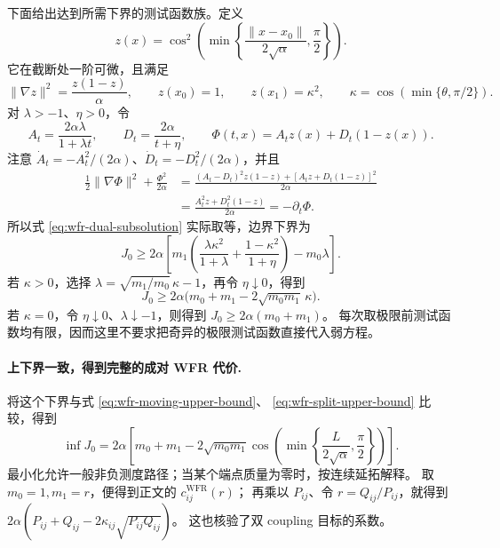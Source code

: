 \documentclass[UTF8,a4paper,11pt,fontset=fandol]{ctexart}
\begin{document}
下面给出达到所需下界的测试函数族。定义
\begin{equation}
z(x)=\cos^2\!\left(
\min\left\{\frac{\|x-x_0\|}{2\sqrt\alpha},\frac\pi2\right\}\right).
\end{equation}
它在截断处一阶可微，且满足
\begin{equation}
\|\nabla z\|^2=\frac{z(1-z)}\alpha,\qquad
z(x_0)=1,\qquad z(x_1)=\kappa^2,\qquad
\kappa=\cos(\min\{\theta,\pi/2\}).
\end{equation}
对 $\lambda>-1$、$\eta>0$，令
\begin{equation}
A_t=\frac{2\alpha\lambda}{1+\lambda t},\qquad
D_t=\frac{2\alpha}{t+\eta},\qquad
\Phi(t,x)=A_tz(x)+D_t(1-z(x)).
\end{equation}
注意 $\dot A_t=-A_t^2/(2\alpha)$、$\dot D_t=-D_t^2/(2\alpha)$，并且
\begin{equation}
\begin{aligned}
\frac12\|\nabla\Phi\|^2+\frac{\Phi^2}{2\alpha}
&=\frac{(A_t-D_t)^2z(1-z)+[A_tz+D_t(1-z)]^2}{2\alpha}\\
&=\frac{A_t^2z+D_t^2(1-z)}{2\alpha}
=-\partial_t\Phi.
\end{aligned}
\end{equation}
所以式 \eqref{eq:wfr-dual-subsolution} 实际取等，边界下界为
\begin{equation}
J_0\ge2\alpha\left[
m_1\left(\frac{\lambda\kappa^2}{1+\lambda}
+\frac{1-\kappa^2}{1+\eta}\right)-m_0\lambda\right].
\end{equation}
若 $\kappa>0$，选择 $\lambda=\sqrt{m_1/m_0}\,\kappa-1$，再令 $\eta\downarrow0$，得到
\begin{equation}
J_0\ge2\alpha\bigl(m_0+m_1-2\sqrt{m_0m_1}\,\kappa\bigr).
\end{equation}
若 $\kappa=0$，令 $\eta\downarrow0$、$\lambda\downarrow-1$，则得到
$J_0\ge2\alpha(m_0+m_1)$。
每次取极限前测试函数均有限，因而这里不要求把奇异的极限测试函数直接代入弱方程。

\paragraph{上下界一致，得到完整的成对 WFR 代价.}
将这个下界与式 \eqref{eq:wfr-moving-upper-bound}、
\eqref{eq:wfr-split-upper-bound} 比较，得到
\begin{equation}
\boxed{
\inf J_0
=2\alpha\left[
m_0+m_1-2\sqrt{m_0m_1}
\cos\!\left(\min\left\{\frac{L}{2\sqrt\alpha},\frac\pi2\right\}\right)
\right].
}
\label{eq:zero-noise-dirac-value}
\end{equation}
最小化允许一般非负测度路径；当某个端点质量为零时，按连续延拓解释。
取 $m_0=1,m_1=r$，便得到正文的 $c_{ij}^{\mathrm{WFR}}(r)$；
再乘以 $P_{ij}$、令 $r=Q_{ij}/P_{ij}$，就得到
$2\alpha(P_{ij}+Q_{ij}-2\kappa_{ij}\sqrt{P_{ij}Q_{ij}})$。
这也核验了双 coupling 目标的系数。
\end{document}
